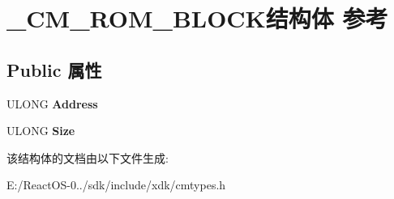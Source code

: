 \hypertarget{struct___c_m___r_o_m___b_l_o_c_k}{}\section{\+\_\+\+C\+M\+\_\+\+R\+O\+M\+\_\+\+B\+L\+O\+C\+K结构体 参考}
\label{struct___c_m___r_o_m___b_l_o_c_k}
\subsection*{Public 属性}
\begin{DoxyCompactItemize}
\item 
\mbox{\label{struct___c_m___r_o_m___b_l_o_c_k_a9af81beab6a84fbe948ddbcec8cdd39b}} 
U\+L\+O\+NG {\bfseries Address}
\item 
\mbox{\label{struct___c_m___r_o_m___b_l_o_c_k_ad25f111215b8ff86a3fe1427ff5890ff}} 
U\+L\+O\+NG {\bfseries Size}
\end{DoxyCompactItemize}


该结构体的文档由以下文件生成\+:\begin{DoxyCompactItemize}
\item 
E\+:/\+React\+O\+S-\/0../sdk/include/xdk/cmtypes.\+h\end{DoxyCompactItemize}
